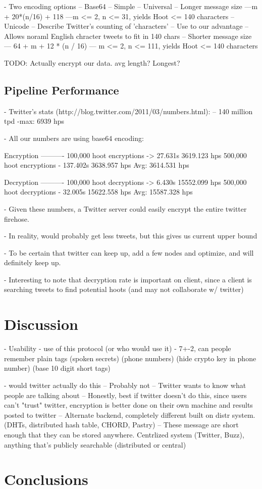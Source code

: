 \documentclass{acm_proc_article-sp}
\begin{document}
- Two encoding options
-- Base64
	-- Simple
	-- Universal
	-- Longer message size 
		---m + 20*(n/16) + 118 
		---m <= 2, n <= 31, yields Hoot <= 140 characters
-- Unicode
	-- Describe Twitter's counting of 'characters'
	-- Use to our advantage
	-- Allows noraml English chracter tweets to fit in 140 chars
	-- Shorter message size
	--- 64 + m + 12 * (n / 16)
	--- m <= 2, n <= 111, yields Hoot <= 140 characters
	
	TODO: Actually encrypt our data. avg length? Longest?

\subsection{Pipeline Performance}

- Twitter's stats (http://blog.twitter.com/2011/03/numbers.html):
	-- 140 million tpd
	-max: 6939 hps
	
- All our numbers are using base64 encoding:

Encryption
----------
100,000 hoot encryptions -> 27.631s        3619.123 hps
500,000 hoot encryptions - 137.402s        3638.957 hps
Avg: 3614.531 hps

Decryption
----------
100,000 hoot decryptions -> 6.430s         15552.099 hps
500,000 hoot decryptions - 32.005s         15622.558 hps
Avg: 15587.328 hps

- Given these numbers, a Twitter server could easily encrypt the entire twitter firehose.

- In reality, would probably get less tweets, but this gives us current upper bound

- To be certain that twitter can keep up, add a few nodes and optimize, and will definitely keep up.

- Interesting to note that decryption rate is important on client, since a client is searching tweets to find potential hoots (and may not collaborate w/ twitter)



\section{Discussion}
- Usability
	- use of this protocol (or who would use it)
	- 7+-2, can people remember plain tags (spoken secrets) (phone numbers) (hide crypto key in phone number) (base 10 digit short tags)
	
- would twitter actually do this
	-- Probably not
	-- Twitter wants to know what people are talking about
	-- Honestly, best if twitter doesn't do this, since users can't "trust" twitter, encryption is better done on their own machine and results posted to twitter
		-- Alternate backend, completely different built on distr system. (DHTs, distributed hash table, CHORD, Pastry)
		-- These message are short enough that they can be stored anywhere. Centrlized system (Twitter, Buzz), anything that's publicly searchable (distributed or central)


\section{Conclusions}






\balancecolumns
\end{document}
